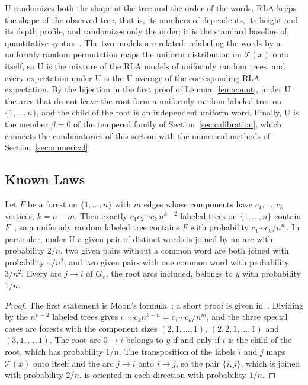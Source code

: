 \documentclass[mathematics,article,submit,pdftex,oneauthor]{Definitions/mdpi}
\newcommand{\T}{\mathcal T}
\begin{document}
U randomizes both the shape of the tree and the order of the words.
RLA keeps the shape of the observed tree, that is, its numbers of dependents, its height and its depth profile, and randomizes only the order; it is the standard baseline of quantitative syntax~\cite{FerreriCancho2004,FerreriCancho2018,AlemanyPuig2022}.
The two models are related: relabeling the words by a uniformly random permutation maps the uniform distribution on $\T(x)$ onto itself, so U is the mixture of the RLA models of uniformly random trees, and every expectation under U is the U-average of the corresponding RLA expectation.
By the bijection in the first proof of Lemma~\ref{lem:count}, under U the arcs that do not leave the root form a uniformly random labeled tree on $\{1,\dots,n\}$, and the child of the root is an independent uniform word.
Finally, U is the member $\beta=0$ of the tempered family of Section~\ref{sec:calibration}, which connects the combinatorics of this section with the numerical methods of Section~\ref{sec:numerical}.

\subsection{Known Laws}\label{sec:known}

\begin{Lemma}\label{lem:edge}
Let $F$ be a forest on $\{1,\dots,n\}$ with $m$ edges whose components have $c_1,\dots,c_k$ vertices, $k=n-m$.
Then exactly $c_1c_2\cdots c_k\,n^{k-2}$ labeled trees on $\{1,\dots,n\}$ contain $F$~\cite{Moon1970,Pitman1999}, so a uniformly random labeled tree contains $F$ with probability $c_1\cdots c_k/n^{m}$.
In particular, under U a given pair of distinct words is joined by an arc with probability $2/n$, two given pairs without a common word are both joined with probability $4/n^2$, and two given pairs with one common word with probability $3/n^2$.
Every arc $j\to i$ of $G_x$, the root arcs included, belongs to $y$ with probability $1/n$.
\end{Lemma}
\begin{proof}
The first statement is Moon's formula~\cite{Moon1970}; a short proof is given in~\cite{Pitman1999}.
Dividing by the $n^{n-2}$ labeled trees gives $c_1\cdots c_kn^{k-n}=c_1\cdots c_k/n^m$, and the three special cases are forests with the component sizes $(2,1,\dots,1)$, $(2,2,1,\dots,1)$ and $(3,1,\dots,1)$.
The root arc $0\to i$ belongs to $y$ if and only if $i$ is the child of the root, which has probability $1/n$.
The transposition of the labels $i$ and $j$ maps $\T(x)$ onto itself and the arc $j\to i$ onto $i\to j$, so the pair $\{i,j\}$, which is joined with probability $2/n$, is oriented in each direction with probability $1/n$.
\end{proof}
\end{document}

